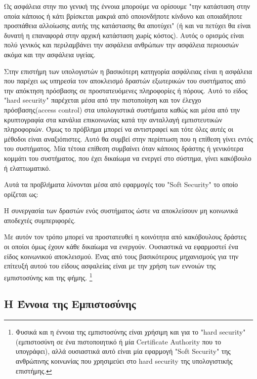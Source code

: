 Ως ασφάλεια στην πιο γενική της έννοια μπορούμε να ορίσουμε "την κατάσταση στην οποία κάποιος ή κάτι βρίσκεται μακριά από οποιονδήποτε κίνδυνο και οποιαδήποτε προσπάθεια αλλοίωσης αυτής της κατάστασης θα αποτύχει" (ή και να πετύχει θα είναι δυνατή η επαναφορά στην αρχική κατάσταση χωρίς κόστος). Αυτός ο ορισμός είναι πολύ γενικός και περιλαμβάνει την ασφάλεια ανθρώπων την ασφάλεια περιουσιών ακόμα και την ασφάλεια υγείας.

Στην επιστήμη των υπολογιστών η βασικότερη κατηγορία ασφάλειας είναι η ασφάλεια που παρέχει ως υπηρεσία τον αποκλεισμό δραστών εξωτερικών του συστήματος από την απόκτηση πρόσβασης σε προστατευόμενες πληροφορίες ή πόρους. Αυτό το είδος "hard security" παρέχεται μέσα από την πιστοποίηση και τον έλεγχο πρόσβασης(access control) στα υπολογιστικά συστήματα καθώς και μέσα από την κρυπτογραφία στα κανάλια επικοινωνίας κατά την ανταλλαγή εμπιστευτικών πληροφοριών. Όμως το πρόβλημα μπορεί να αντιστραφεί και τότε όλες αυτές οι μέθοδοι είναι αναξιόπιστες. Αυτό θα συμβεί στην περίπτωση που η επίθεση γίνει εντός του συστήματος. Μία τέτοια επίθεση συμβαίνει όταν κάποιος δράστης ή γενικότερα κομμάτι του συστήματος, που έχει δικαίωμα να ενεργεί στο σύστημα, γίνει κακόβουλο ή ελαττωματικό. 

Αυτά τα προβλήματα λύνονται μέσα από εφαρμογές του "Soft Security" το οποίο ορίζεται ως: 

\begin{soft_sec}
Η συνεργασία των δραστών ενός συστήματος ώστε να αποκλείσουν μη κοινωνικά αποδεχτές συμπεριφορές. 
\end{soft_sec}

Με αυτόν τον τρόπο μπορεί να προστατευθεί η κοινότητα από κακόβουλους δράστες οι οποίοι όμως έχουν κάθε δικαίωμα να ενεργούν. Ουσιαστικά να εφαρμοστεί ένα είδος κοινωνικού αποκλεισμού. Ένας από τους βασικότερους μηχανισμούς για την επίτευξή αυτού του είδους ασφαλείας είναι με την χρήση των εννοιών της εμπιστοσύνης και της φήμης. \footnote{Φυσικά και η έννοια της εμπιστοσύνης είναι χρήσιμη και για το "hard security" (εμπιστοσύνη σε ένα πιστοποιητικό ή μία Certificate Authority που το υπογράφει), αλλά ουσιαστικά αυτό είναι μία εφαρμογή "Soft Security" της ανθρώπινης κοινωνίας που χρησιμεύει στο hard security της υπολογιστικής επιστήμης.} 


\subsection{Η Έννοια της Εμπιστοσύνης}\label{sec:trust}

